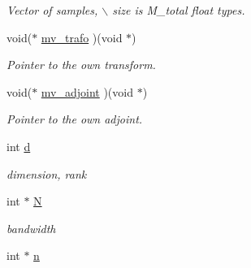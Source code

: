 \begin{CompactItemize}
\begin{CompactList}\small\item\em Vector of samples, $\backslash$ size is M\_\-total float types. \item\end{CompactList}\item 
\hypertarget{structnfst__plan_4a3b2ecc26204b3087d1c19b7857943f}{
void($\ast$ \hyperlink{structnfst__plan_4a3b2ecc26204b3087d1c19b7857943f}{mv\_\-trafo} )(void $\ast$)}
\label{structnfst__plan_4a3b2ecc26204b3087d1c19b7857943f}

\begin{CompactList}\small\item\em Pointer to the own transform. \item\end{CompactList}\item 
\hypertarget{structnfst__plan_edfe6da9afb5dc0457cc4f2197034fc0}{
void($\ast$ \hyperlink{structnfst__plan_edfe6da9afb5dc0457cc4f2197034fc0}{mv\_\-adjoint} )(void $\ast$)}
\label{structnfst__plan_edfe6da9afb5dc0457cc4f2197034fc0}

\begin{CompactList}\small\item\em Pointer to the own adjoint. \item\end{CompactList}\item 
\hypertarget{structnfst__plan_ef00c63a4810c8e5b0eb4839d2c6abc8}{
int \hyperlink{structnfst__plan_ef00c63a4810c8e5b0eb4839d2c6abc8}{d}}
\label{structnfst__plan_ef00c63a4810c8e5b0eb4839d2c6abc8}

\begin{CompactList}\small\item\em dimension, rank \item\end{CompactList}\item 
\hypertarget{structnfst__plan_c0ddde49b376d65b38d3cf1583cb0f6b}{
int $\ast$ \hyperlink{structnfst__plan_c0ddde49b376d65b38d3cf1583cb0f6b}{N}}
\label{structnfst__plan_c0ddde49b376d65b38d3cf1583cb0f6b}

\begin{CompactList}\small\item\em bandwidth \item\end{CompactList}\item 
\hypertarget{structnfst__plan_bee0aa8e104775a5b898715ea28703d2}{
int $\ast$ \hyperlink{structnfst__plan_bee0aa8e104775a5b898715ea28703d2}{n}}
\label{structnfst__plan_bee0aa8e104775a5b898715ea28703d2}


\end{CompactItemize}
